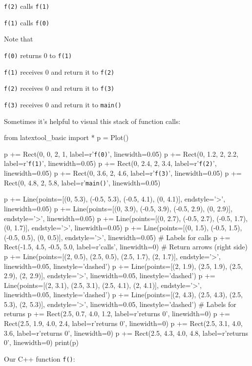 \texttt{f(2)} calls \texttt{f(1)}

\texttt{f(1)} calls \texttt{f(0)}

Note that

\texttt{f(0)} returns 0 to \texttt{f(1)}

\texttt{f(1)} receives 0 and return it to \texttt{f(2)}

\texttt{f(2)} receives 0 and return it to \texttt{f(3)}

\texttt{f(3)} receives 0 and return it to \texttt{main()}

Sometimes it's helpful to visual this stack of function
calls:

\begin{python}
from latextool_basic import *
p = Plot()

p += Rect(0, 0, 2, 1, label=r'\texttt{f(0)}', linewidth=0.05)
p += Rect(0, 1.2, 2, 2.2, label=r'\texttt{f(1)}', linewidth=0.05)
p += Rect(0, 2.4, 2, 3.4, label=r'\texttt{f(2)}', linewidth=0.05)
p += Rect(0, 3.6, 2, 4.6, label=r'\texttt{f(3)}', linewidth=0.05)
p += Rect(0, 4.8, 2, 5.8, label=r'\texttt{main()}', linewidth=0.05)

p += Line(points=[(0, 5.3), (-0.5, 5.3), (-0.5, 4.1), (0, 4.1)], endstyle='>', linewidth=0.05)
p += Line(points=[(0, 3.9), (-0.5, 3.9), (-0.5, 2.9), (0, 2.9)], endstyle='>', linewidth=0.05)
p += Line(points=[(0, 2.7), (-0.5, 2.7), (-0.5, 1.7), (0, 1.7)], endstyle='>', linewidth=0.05)
p += Line(points=[(0, 1.5), (-0.5, 1.5), (-0.5, 0.5), (0, 0.5)], endstyle='>', linewidth=0.05)
# Labels for calls
p += Rect(-1.5, 4.5, -0.5, 5.0, label=r'\small{calls}', linewidth=0)
# Return arrows (right side)
p += Line(points=[(2, 0.5), (2.5, 0.5), (2.5, 1.7), (2, 1.7)], endstyle='>', linewidth=0.05, linestyle='dashed')
p += Line(points=[(2, 1.9), (2.5, 1.9), (2.5, 2.9), (2, 2.9)], endstyle='>', linewidth=0.05, linestyle='dashed')
p += Line(points=[(2, 3.1), (2.5, 3.1), (2.5, 4.1), (2, 4.1)], endstyle='>', linewidth=0.05, linestyle='dashed')
p += Line(points=[(2, 4.3), (2.5, 4.3), (2.5, 5.3), (2, 5.3)], endstyle='>', linewidth=0.05, linestyle='dashed')
# Labels for returns
p += Rect(2.5, 0.7, 4.0, 1.2, label=r'\small{returns 0}', linewidth=0)
p += Rect(2.5, 1.9, 4.0, 2.4, label=r'\small{returns 0}', linewidth=0)
p += Rect(2.5, 3.1, 4.0, 3.6, label=r'\small{returns 0}', linewidth=0)
p += Rect(2.5, 4.3, 4.0, 4.8, label=r'\small{returns 0}', linewidth=0)
print(p)
\end{python}

Our C++ function \texttt{f()}:

